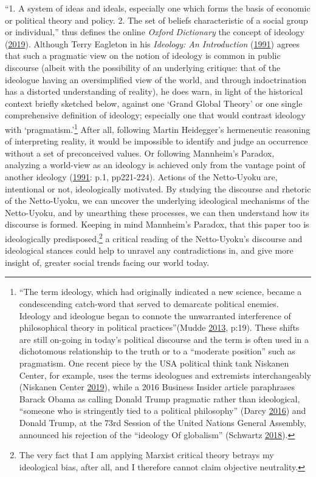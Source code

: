 \documentclass[10pt,british,A4paper,,openany]{memoir}
\begin{document}
``1. A system of ideas and ideals, especially one which forms the basis
of economic or political theory and policy. 2. The set of beliefs
characteristic of a social group or individual,'' thus defines the
online \emph{Oxford Dictionary} the concept of ideology
(\protect\hyperlink{ref-oxforddictionaries.com_ideology_2019}{2019}).
Although Terry Eagleton in his \emph{Ideology: An Introduction}
(\protect\hyperlink{ref-eagleton_ideology:_1991}{1991}) agrees that such
a pragmatic view on the notion of ideology is common in public discourse
(albeit with the possibility of an underlying critique: that of the
ideologue having an oversimplified view of the world, and through
indoctrination has a distorted understanding of reality), he does warn,
in light of the historical context briefly sketched below, against one
`Grand Global Theory' or one single comprehensive definition of
ideology; especially one that would contrast ideology with
`pragmatism.'\footnote{``The term ideology, which had originally
  indicated a new science, became a condescending catch-word that served
  to demarcate political enemies. Ideology and ideologue began to
  connote the unwarranted interference of philosophical theory in
  political practices''(Mudde
  \protect\hyperlink{ref-mudde_oxford_2013}{2013}, p:19). These shifts
  are still on-going in today's political discourse and the term is
  often used in a dichotomous relationship to the truth or to a
  ``moderate position'' such as pragmatism. One recent piece by the USA
  political think tank Niskanen Center, for example, uses the terms
  ideologues and extremists interchangeably (Niskanen Center
  \protect\hyperlink{ref-niskanen_center_if_2019}{2019}), while a 2016
  Business Insider article paraphrases Barack Obama as calling Donald
  Trump pragmatic rather than ideological, ``someone who is stringently
  tied to a political philosophy'' (Darcy
  \protect\hyperlink{ref-darcy_obama_2016}{2016}) and Donald Trump, at
  the 73rd Session of the United Nations General Assembly, announced his
  rejection of the ``ideology Of globalism'' (Schwartz
  \protect\hyperlink{ref-schwartz_trump_2018}{2018}).} After all,
following Martin Heidegger's hermeneutic reasoning of interpreting
reality, it would be impossible to identify and judge an occurrence
without a set of preconceived values. Or following Mannheim's Paradox,
analyzing a world-view as an ideology is achieved only from the vantage
point of another ideology
(\protect\hyperlink{ref-eagleton_ideology:_1991}{1991}: p.1, pp221-224).
Actions of the Netto-Uyoku are, intentional or not, ideologically
motivated. By studying the discourse and rhetoric of the Netto-Uyoku, we
can uncover the underlying ideological mechanisms of the Netto-Uyoku,
and by unearthing these processes, we can then understand how its
discourse is formed. Keeping in mind Mannheim's Paradox, that this paper
too is ideologically predisposed,\footnote{The very fact that I am
  applying Marxist critical theory betrays my ideological bias, after
  all, and I therefore cannot claim objective neutrality.} a critical
reading of the Netto-Uyoku's discourse and ideological stances could
help to unravel any contradictions in, and give more insight of, greater
social trends facing our world today.
\end{document}
